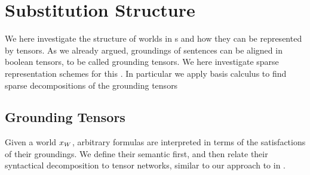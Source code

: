 
\section{Substitution Structure}

We here investigate the structure of worlds in \firstOrderLogic{}s and how they can be represented by tensors.
As we already argued, groundings of sentences can be aligned in boolean tensors, to be called grounding tensors.
We here investigate sparse representation schemes for this \substitutionStructure{}.
In particular we apply basis calculus to find sparse decompositions of the grounding tensors





\subsection{Grounding Tensors}

Given a \firstOrderLogic{} world $x_{W}$, arbitrary formulas are interpreted in terms of the satisfactions of their groundings.
We define their semantic first, and then relate their syntactical decomposition to tensor networks, similar to our approach to \propositionalLogic{} in .

